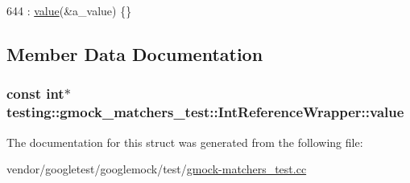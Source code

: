 \begin{DoxyCode}
644 : \hyperlink{structtesting_1_1gmock__matchers__test_1_1IntReferenceWrapper_ac8fcb05733aa1fdb6c5236731b236cf6}{value}(&a\_value) \{\}
\end{DoxyCode}


\subsection{Member Data Documentation}
\subsubsection[{\texorpdfstring{value}{value}}]{\setlength{\rightskip}{0pt plus 5cm}const int$\ast$ testing\+::gmock\+\_\+matchers\+\_\+test\+::\+Int\+Reference\+Wrapper\+::value}\hypertarget{structtesting_1_1gmock__matchers__test_1_1IntReferenceWrapper_ac8fcb05733aa1fdb6c5236731b236cf6}{}\label{structtesting_1_1gmock__matchers__test_1_1IntReferenceWrapper_ac8fcb05733aa1fdb6c5236731b236cf6}


The documentation for this struct was generated from the following file\+:\begin{DoxyCompactItemize}
\item 
vendor/googletest/googlemock/test/\hyperlink{gmock-matchers__test_8cc}{gmock-\/matchers\+\_\+test.\+cc}\end{DoxyCompactItemize}
